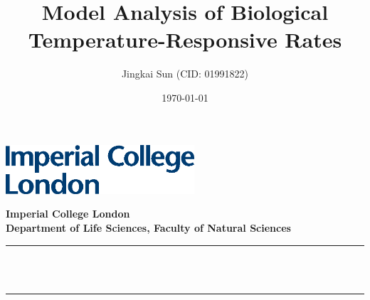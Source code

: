 \documentclass[11pt]{article}
\title{Model Analysis of Biological Temperature-Responsive Rates}
\author{Jingkai Sun (CID: 01991822)}
\date{\today}
\begin{document}
\begin{titlepage}

    \newcommand{\HRule}{\rule{\linewidth}{0.5mm}} %
    \newcommand{\wordcount}{} %
    
    
    \includegraphics[width=7cm]{images/logo.eps}\\[1cm] 
     
    
    \center %
    
    
    \textbf{\large Imperial College London}\\[0.8 cm] %
    \textbf{\large Department of Life Sciences, Faculty of Natural Sciences}\\[0.8 cm] %
    \makeatletter
    \HRule \\[0.6cm]
    { \huge \bfseries \@title}\\[0.6cm] %
    \HRule \\[1.5cm]


\end{titlepage}
\end{document}
